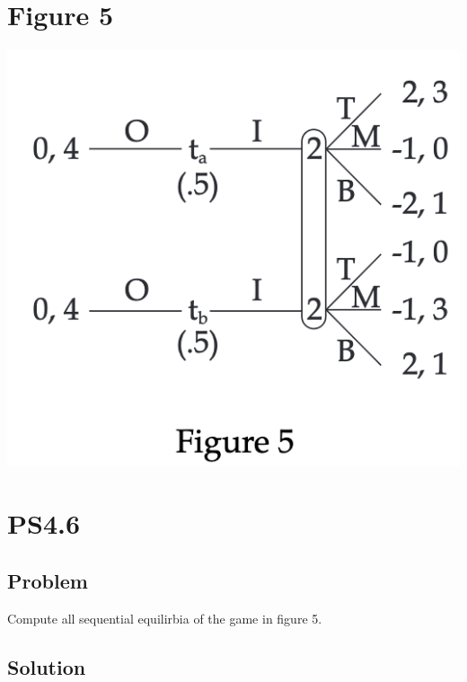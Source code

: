 \documentclass[10pt, a4paper]{article}
\begin{document}
  \section*{Figure 5}
    \begin{center}
      \includegraphics*{fig5.png}
    \end{center}
  \section*{PS4.6}
    \subsection*{Problem}
      Compute all sequential equilirbia of the game in figure 5.
    \subsection*{Solution}
\end{document}
